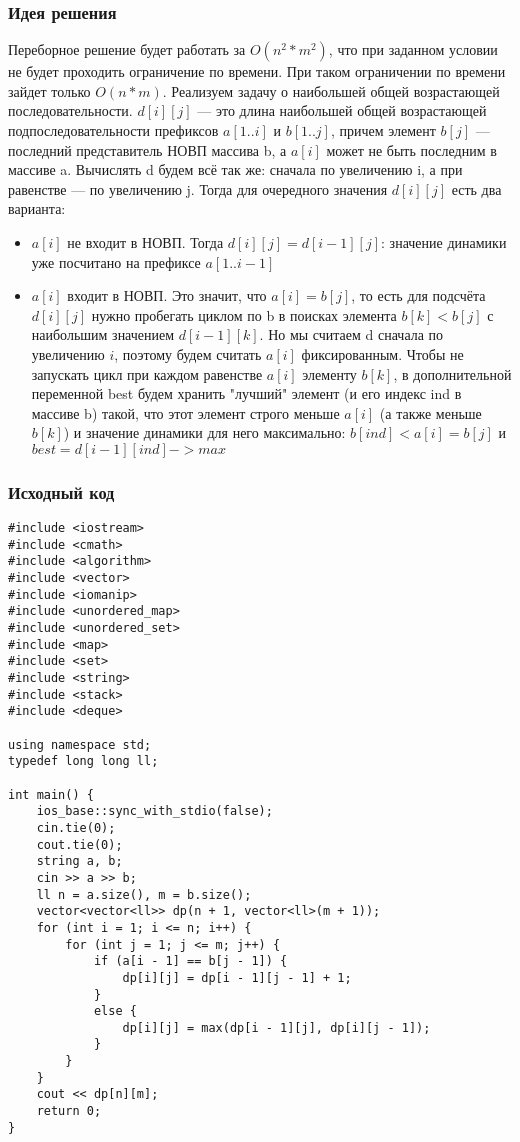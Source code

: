 \documentclass[12pt]{article}
\begin{document}
\subsubsection*{Идея решения}
Переборное решение будет работать за $O(n^2 * m^2)$, что при заданном условии не будет проходить ограничение по времени. При таком ограничении по времени зайдет только $O(n*m)$. Реализуем задачу о наибольшей общей возрастающей последовательности. $d[i][j]$ — это длина наибольшей общей возрастающей подпоследовательности префиксов $a[1..i]$ и $b[1..j]$, причем элемент $b[j]$ — последний представитель НОВП массива b, а $a[i]$ может не быть последним в массиве a. Вычислять d будем всё так же: сначала по увеличению i, а при равенстве — по увеличению j. Тогда для очередного значения $d[i][j]$ есть два варианта: 
\begin{itemize}
\item $a[i]$ не входит в НОВП. Тогда $d[i][j] = d[i-1][j]$: значение динамики уже посчитано на префиксе $a[1..i-1]$
\item $a[i]$ входит в НОВП. Это значит, что $a[i]=b[j]$, то есть для подсчёта $d[i][j]$ нужно пробегать циклом по b в поисках элемента $b[k]<b[j]$ с наибольшим значением $d[i-1][k]$. Но мы считаем d сначала по увеличению $i$, поэтому будем считать $a[i]$ фиксированным. Чтобы не запускать цикл при каждом равенстве $a[i]$ элементу $b[k]$, в дополнительной переменной best будем хранить "лучший" элемент (и его индекс ind в массиве b) такой, что этот элемент строго меньше $a[i]$ (а также меньше $b[k]$) и значение динамики для него максимально: $b[ind]<a[i]=b[j]$ и $best=d[i-1][ind] -> max$
\end{itemize}
\subsubsection*{Исходный код}
\begin{lstlisting}
#include <iostream>
#include <cmath>
#include <algorithm>
#include <vector>
#include <iomanip>
#include <unordered_map>
#include <unordered_set>
#include <map>
#include <set>
#include <string>
#include <stack>
#include <deque>

using namespace std;
typedef long long ll;

int main() {
    ios_base::sync_with_stdio(false);
    cin.tie(0);
    cout.tie(0);
    string a, b;
    cin >> a >> b;
    ll n = a.size(), m = b.size();
    vector<vector<ll>> dp(n + 1, vector<ll>(m + 1));
    for (int i = 1; i <= n; i++) {
        for (int j = 1; j <= m; j++) {
            if (a[i - 1] == b[j - 1]) {
                dp[i][j] = dp[i - 1][j - 1] + 1;
            }
            else {
                dp[i][j] = max(dp[i - 1][j], dp[i][j - 1]);
            }
        }
    }
    cout << dp[n][m];
    return 0;
}
\end{lstlisting}
\end{document}
